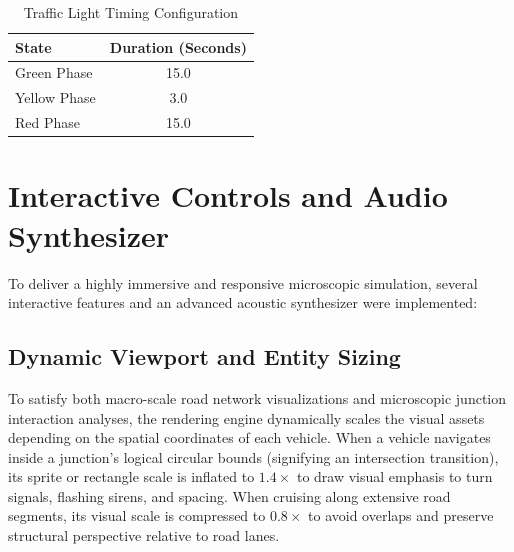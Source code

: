 \documentclass[../report_main.tex]{subfiles}
\begin{document}
\begin{table}[H]
\centering
\caption{Traffic Light Timing Configuration}
\label{tab:traffic_light_timing}
\begin{tabular}{|l|c|}
\hline
\textbf{State} & \textbf{Duration (Seconds)} \\ \hline
Green Phase    & 15.0                        \\ \hline
Yellow Phase   & 3.0                         \\ \hline
Red Phase      & 15.0                        \\ \hline
\end{tabular}
\end{table}

\section{Interactive Controls and Audio Synthesizer}
To deliver a highly immersive and responsive microscopic simulation, several interactive features and an advanced acoustic synthesizer were implemented:

\subsection{Dynamic Viewport and Entity Sizing}
To satisfy both macro-scale road network visualizations and microscopic junction interaction analyses, the rendering engine dynamically scales the visual assets depending on the spatial coordinates of each vehicle. When a vehicle navigates inside a junction's logical circular bounds (signifying an intersection transition), its sprite or rectangle scale is inflated to $1.4\times$ to draw visual emphasis to turn signals, flashing sirens, and spacing. When cruising along extensive road segments, its visual scale is compressed to $0.8\times$ to avoid overlaps and preserve structural perspective relative to road lanes.

\end{document}
